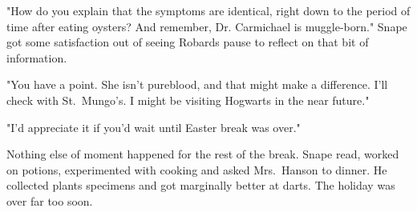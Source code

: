 "How do you explain that the symptoms are identical, right down to the period of time after eating oysters? And remember, Dr. Carmichael is muggle-born." Snape got some satisfaction out of seeing Robards pause to reflect on that bit of information.

"You have a point. She isn't pureblood, and that might make a difference. I'll check with St.~Mungo's. I might be visiting Hogwarts in the near future."

"I'd appreciate it if you'd wait until Easter break was over."

Nothing else of moment happened for the rest of the break. Snape read, worked on potions, experimented with cooking and asked Mrs.~Hanson to dinner. He collected plants specimens and got marginally better at darts. The holiday was over far too soon. 


